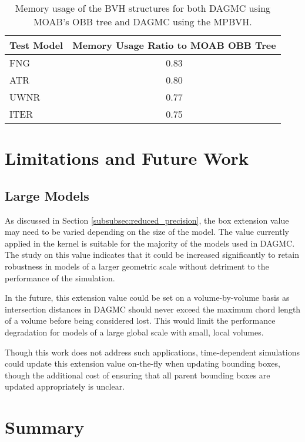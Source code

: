 \begin{table}
  \small
  \begin{center}
    \begin{tabular}{lc}

      \toprule
      Test Model & Memory Usage Ratio to MOAB OBB Tree \\
      \hline
      FNG           & 0.83 \\
      ATR           & 0.80 \\
      UWNR          & 0.77 \\
      ITER          & 0.75 \\
      \bottomrule
    \end{tabular}
  \end{center}
  \caption{Memory usage of the BVH structures for both DAGMC using MOAB's OBB
    tree and DAGMC using the MPBVH.}
  \label{tab:mpbvh_memory}
\end{table}

\section{Limitations and Future Work}

\subsection{Large Models}

As discussed in Section \ref{subsubsec:reduced_precision}, the box extension
value may need to be varied depending on the size of the model. The value
currently applied in the kernel is suitable for the majority of the models used
in DAGMC. The study on this value indicates that it could be increased
significantly to retain robustness in models of a larger geometric scale without
detriment to the performance of the simulation.

In the future, this extension value could be set on a volume-by-volume basis as
intersection distances in DAGMC should never exceed the maximum chord length of
a volume before being considered lost. This would limit the performance
degradation for models of a large global scale with small, local volumes.

Though this work does not address such applications, time-dependent simulations
could update this extension value on-the-fly when updating bounding boxes,
though the additional cost of ensuring that all parent bounding boxes are
updated appropriately is unclear.

\section{Summary}

